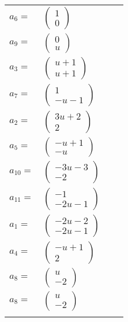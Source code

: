 \documentclass[1p]{elsarticle_modified}
\theoremstyle{definition}
\begin{document}
\begin{tabular}{m{7pt} m{180pt} m{7pt} m{180pt} }
\flushright $a_{6}=$&$\begin{pmatrix}1\\0\end{pmatrix}$ \\
\flushright $a_{9}=$&$\begin{pmatrix}0\\u\end{pmatrix}$ \\
\flushright $a_{3}=$&$\begin{pmatrix}u+1\\u+1\end{pmatrix}$ \\
\flushright $a_{7}=$&$\begin{pmatrix}1\\- u-1\end{pmatrix}$ \\
\flushright $a_{2}=$&$\begin{pmatrix}3 u+2\\2\end{pmatrix}$ \\
\flushright $a_{5}=$&$\begin{pmatrix}- u+1\\- u\end{pmatrix}$ \\
\flushright $a_{10}=$&$\begin{pmatrix}-3 u-3\\-2\end{pmatrix}$ \\
\flushright $a_{11}=$&$\begin{pmatrix}-1\\-2 u-1\end{pmatrix}$ \\
\flushright $a_{1}=$&$\begin{pmatrix}-2 u-2\\-2 u-1\end{pmatrix}$ \\
\flushright $a_{4}=$&$\begin{pmatrix}- u+1\\2\end{pmatrix}$ \\
\flushright $a_{8}=$&$\begin{pmatrix}u\\-2\end{pmatrix}$\\ \flushright $a_{8}=$&$\begin{pmatrix}u\\-2\end{pmatrix}$\\&\end{tabular}
\end{document}
